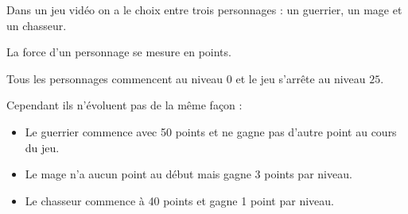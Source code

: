 
\bigskip
 
Dans un jeu vidéo on a le choix entre trois personnages : un guerrier, un mage et un chasseur. 

La force d'un personnage se mesure en points.
 
Tous les personnages commencent au niveau $0$ et le jeu s'arrête au niveau $25$. 

Cependant ils n'évoluent pas de la même façon :

\setlength\parindent{8mm} 
\begin{itemize}
\item[\decoone~~] Le guerrier commence avec 50 points et ne gagne pas d'autre point au cours du jeu. 
\item[\decoone~~] Le mage n'a aucun point au début mais gagne 3 points par niveau. 
\item[\decoone~~] Le chasseur commence à 40 points et gagne 1 point par niveau. 
\end{itemize}
\setlength\parindent{0mm}

\medskip

